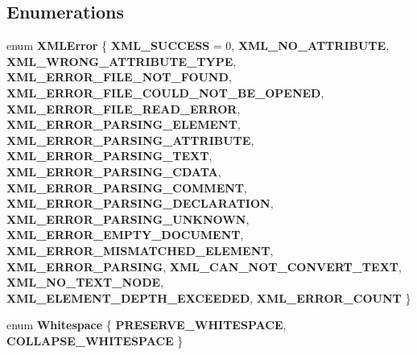 \subsection*{Enumerations}
\begin{DoxyCompactItemize}
\item 
enum \textbf{ X\+M\+L\+Error} \{ \newline
\textbf{ X\+M\+L\+\_\+\+S\+U\+C\+C\+E\+SS} = 0, 
\textbf{ X\+M\+L\+\_\+\+N\+O\+\_\+\+A\+T\+T\+R\+I\+B\+U\+TE}, 
\textbf{ X\+M\+L\+\_\+\+W\+R\+O\+N\+G\+\_\+\+A\+T\+T\+R\+I\+B\+U\+T\+E\+\_\+\+T\+Y\+PE}, 
\textbf{ X\+M\+L\+\_\+\+E\+R\+R\+O\+R\+\_\+\+F\+I\+L\+E\+\_\+\+N\+O\+T\+\_\+\+F\+O\+U\+ND}, 
\newline
\textbf{ X\+M\+L\+\_\+\+E\+R\+R\+O\+R\+\_\+\+F\+I\+L\+E\+\_\+\+C\+O\+U\+L\+D\+\_\+\+N\+O\+T\+\_\+\+B\+E\+\_\+\+O\+P\+E\+N\+ED}, 
\textbf{ X\+M\+L\+\_\+\+E\+R\+R\+O\+R\+\_\+\+F\+I\+L\+E\+\_\+\+R\+E\+A\+D\+\_\+\+E\+R\+R\+OR}, 
\textbf{ X\+M\+L\+\_\+\+E\+R\+R\+O\+R\+\_\+\+P\+A\+R\+S\+I\+N\+G\+\_\+\+E\+L\+E\+M\+E\+NT}, 
\textbf{ X\+M\+L\+\_\+\+E\+R\+R\+O\+R\+\_\+\+P\+A\+R\+S\+I\+N\+G\+\_\+\+A\+T\+T\+R\+I\+B\+U\+TE}, 
\newline
\textbf{ X\+M\+L\+\_\+\+E\+R\+R\+O\+R\+\_\+\+P\+A\+R\+S\+I\+N\+G\+\_\+\+T\+E\+XT}, 
\textbf{ X\+M\+L\+\_\+\+E\+R\+R\+O\+R\+\_\+\+P\+A\+R\+S\+I\+N\+G\+\_\+\+C\+D\+A\+TA}, 
\textbf{ X\+M\+L\+\_\+\+E\+R\+R\+O\+R\+\_\+\+P\+A\+R\+S\+I\+N\+G\+\_\+\+C\+O\+M\+M\+E\+NT}, 
\textbf{ X\+M\+L\+\_\+\+E\+R\+R\+O\+R\+\_\+\+P\+A\+R\+S\+I\+N\+G\+\_\+\+D\+E\+C\+L\+A\+R\+A\+T\+I\+ON}, 
\newline
\textbf{ X\+M\+L\+\_\+\+E\+R\+R\+O\+R\+\_\+\+P\+A\+R\+S\+I\+N\+G\+\_\+\+U\+N\+K\+N\+O\+WN}, 
\textbf{ X\+M\+L\+\_\+\+E\+R\+R\+O\+R\+\_\+\+E\+M\+P\+T\+Y\+\_\+\+D\+O\+C\+U\+M\+E\+NT}, 
\textbf{ X\+M\+L\+\_\+\+E\+R\+R\+O\+R\+\_\+\+M\+I\+S\+M\+A\+T\+C\+H\+E\+D\+\_\+\+E\+L\+E\+M\+E\+NT}, 
\textbf{ X\+M\+L\+\_\+\+E\+R\+R\+O\+R\+\_\+\+P\+A\+R\+S\+I\+NG}, 
\newline
\textbf{ X\+M\+L\+\_\+\+C\+A\+N\+\_\+\+N\+O\+T\+\_\+\+C\+O\+N\+V\+E\+R\+T\+\_\+\+T\+E\+XT}, 
\textbf{ X\+M\+L\+\_\+\+N\+O\+\_\+\+T\+E\+X\+T\+\_\+\+N\+O\+DE}, 
\textbf{ X\+M\+L\+\_\+\+E\+L\+E\+M\+E\+N\+T\+\_\+\+D\+E\+P\+T\+H\+\_\+\+E\+X\+C\+E\+E\+D\+ED}, 
\textbf{ X\+M\+L\+\_\+\+E\+R\+R\+O\+R\+\_\+\+C\+O\+U\+NT}
 \}
\item 
enum \textbf{ Whitespace} \{ \textbf{ P\+R\+E\+S\+E\+R\+V\+E\+\_\+\+W\+H\+I\+T\+E\+S\+P\+A\+CE}, 
\textbf{ C\+O\+L\+L\+A\+P\+S\+E\+\_\+\+W\+H\+I\+T\+E\+S\+P\+A\+CE}
 \}
\end{DoxyCompactItemize}
